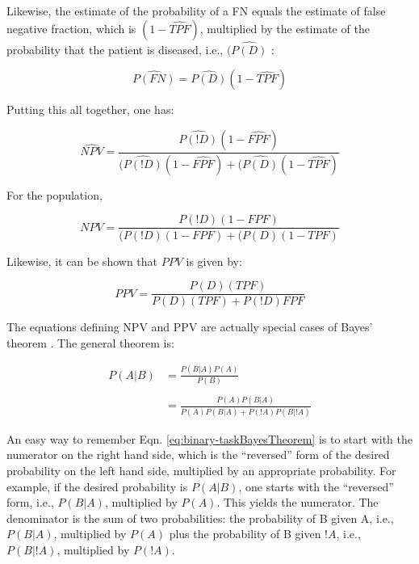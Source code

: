 \documentclass[
]{book}
\begin{document}
Likewise, the estimate of the probability of a FN equals the estimate of false negative fraction, which is \((1-\widehat{TPF})\), multiplied by the estimate of the probability that the patient is diseased, i.e., \((\widehat{P(D)}\) :

\begin{equation} 
\widehat{P(FN)}=\widehat{P(D)}(1-\widehat{TPF})
\label{eq:binary-taskPFNEst}
\end{equation}

Putting this all together, one has:

\begin{equation} 
\widehat{NPV}=\frac{\widehat{P(!D)}(1-\widehat{FPF})}{(\widehat{P(!D)}(1-\widehat{FPF})+(\widehat{P(D)}(1-\widehat{TPF})}
\label{eq:binary-taskNPVFormula}
\end{equation}

For the population,

\begin{equation} 
NPV=\frac{P(!D)(1-FPF)}{(P(!D)(1-FPF)+(P(D)(1-TPF)}
\label{eq:binary-taskNPVFormula-pop}
\end{equation}

Likewise, it can be shown that \(PPV\) is given by:

\begin{equation} 
PPV =\frac{P(D)(TPF)}{P(D)(TPF)+P(!D)FPF}
\label{eq:binary-taskPPV}
\end{equation}

The equations defining NPV and PPV are actually special cases of Bayes' theorem \citep{RN1492}. The general theorem is:

\begin{equation} 
\begin{aligned}
P(A|B)&=\frac{P(B|A)P(A)}{P(B)} \\
\\
&=\frac{P(A)P(B|A)}{P(A)P(B|A)+P(!A)P(B|!A)}
\end{aligned}
\label{eq:binary-taskBayesTheorem}
\end{equation}

An easy way to remember Eqn. \eqref{eq:binary-taskBayesTheorem} is to start with the numerator on the right hand side, which is the ``reversed'' form of the desired probability on the left hand side, multiplied by an appropriate probability. For example, if the desired probability is \(P(A|B)\), one starts with the ``reversed'' form, i.e., \(P(B|A)\), multiplied by \(P(A)\). This yields the numerator. The denominator is the sum of two probabilities: the probability of B given A, i.e., \(P(B|A)\), multiplied by \(P(A)\) plus the probability of B given \(!A\), i.e., \(P(B|!A)\), multiplied by \(P(!A)\).
\end{document}
